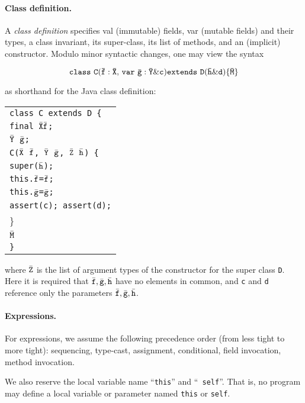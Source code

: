\documentclass{article}
\begin{document}
\paragraph{Class definition.}

A {\em class definition} specifies val (immutable) fields, var
(mutable fields) and their types, a class invariant, its super-class,
its list of methods, and an (implicit) constructor. Modulo minor
syntactic changes, one may view the syntax

$$
{\tt class\ C(\tt \bar{\tt f}:\bar{\tt X},\, var\ \tt\bar{\tt g}:\bar{\tt Y}\& c)extends\ D(\tt\bar{\tt h}\&d)\{\bar{\tt M}\}}
$$

\noindent as shorthand for the Java class definition:

{\footnotesize
\begin{tabular}[t]{l}
\tt class C extends D \{ \\
\tt  \quad\quad\quad final $\bar{\tt X} \bar{\tt f}$;\\
 \tt \quad\quad\quad $\bar{\tt Y}$\ $\bar{\tt g}$; \\
 \tt \quad\quad\quad C($\bar{\tt X}$\ $\bar{\tt f}$,\,$\bar{\tt Y}$\ $\bar{\tt g}$,\,$\bar{\tt Z}$\,$\bar{\tt h}$) \{\\
  \tt super($\bar{\tt h}$); \\
  \tt this.$\bar{\tt f}$=$\bar{\tt f}$;\\
  \tt this.$\bar{\tt g}$=$\bar{\tt g}$;\\
  \tt assert(c); assert(d);\\
 \} \\
\tt $\bar{\tt M}$\\
\tt \}
\end{tabular}}


\noindent where $\bar{\tt Z}$ is the list of argument types of the
constructor for the super class {\tt D}. Here it is required that
$\bar{\tt f},\bar{\tt g},\bar{\tt h}$ have no elements in common, and
{\tt c} and {\tt d} reference only the parameters $\bar{\tt
f},\bar{\tt g},\bar{\tt h}$.

\paragraph{Expressions.}
For expressions, we assume the following precedence order (from less
tight to more tight): sequencing, type-cast, assignment, conditional,
field invocation, method invocation.

We also reserve the local variable name ``{\tt this}'' and ``{\tt
self}''. That is, no program may define a local variable or parameter
named {\tt this} or {\tt self}. 
\end{document}
